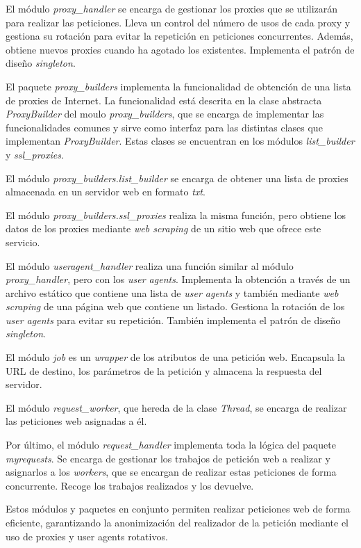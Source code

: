 El módulo \textit{proxy\_handler} se encarga de gestionar los proxies que se utilizarán para 
realizar las peticiones. Lleva un control del número de usos de cada proxy y gestiona su rotación 
para evitar la repetición en peticiones concurrentes. Además, obtiene nuevos proxies cuando ha 
agotado los existentes. Implementa el patrón de diseño \textit{singleton}.

El paquete \textit{proxy\_builders} implementa la funcionalidad de obtención de una lista de 
proxies de Internet. La funcionalidad está descrita en la clase abstracta \textit{ProxyBuilder} del moulo \textit{proxy\_builders}, 
que se encarga de implementar las funcionalidades comunes y sirve como interfaz para las distintas 
clases que implementan \textit{ProxyBuilder}. Estas clases se encuentran en los
 módulos \textit{list\_builder} y \textit{ssl\_proxies}.

El módulo \textit{proxy\_builders.list\_builder} se encarga de obtener una lista de proxies almacenada en un
 servidor web en formato \textit{txt}.

El módulo \textit{proxy\_builders.ssl\_proxies} realiza la misma función, pero obtiene los datos de los 
proxies mediante \textit{web scraping} de un sitio web que ofrece este servicio.

El módulo \textit{useragent\_handler} realiza una función similar al 
módulo \textit{proxy\_handler}, pero con los \textit{user agents}. Implementa la obtención a 
través de un archivo estático que contiene una lista de \textit{user agents} y también mediante \textit{web scraping} de una página web que contiene un listado. Gestiona la rotación de los \textit{user agents} para evitar su repetición. También implementa el patrón de diseño \textit{singleton}.

El módulo \textit{job} es un \textit{wrapper} de los atributos de una petición web. 
Encapsula la URL de destino, los parámetros de la petición y almacena la respuesta del servidor.

El módulo \textit{request\_worker}, que hereda de la clase \textit{Thread}, se encarga de 
realizar las peticiones web asignadas a él.

Por último, el módulo \textit{request\_handler} implementa toda la lógica del 
paquete \textit{myrequests}. Se encarga de gestionar los trabajos de petición web a realizar y 
asignarlos a los \textit{workers}, que se encargan de realizar estas peticiones de forma concurrente. 
Recoge los trabajos realizados y los devuelve.

Estos módulos y paquetes en conjunto permiten realizar peticiones web de forma eficiente, 
garantizando la anonimización del realizador de la petición mediante el uso de proxies y user 
agents rotativos.

